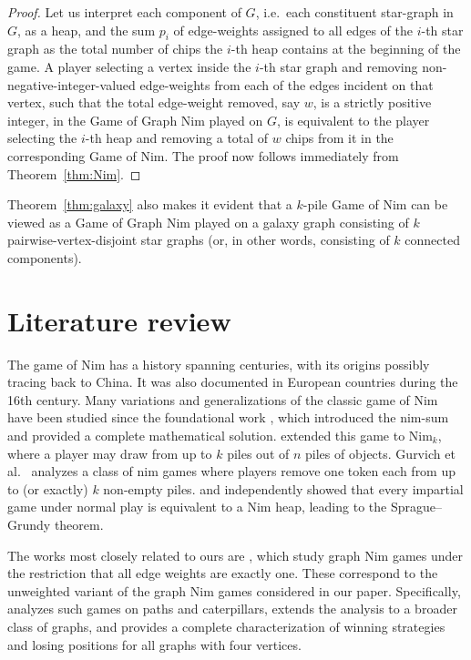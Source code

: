 \documentclass[11pt,reqno]{amsart}
\theoremstyle{definition}
\theoremstyle{definition}
\begin{document}
\begin{proof}
Let us interpret each component of $G$, i.e.\ each constituent star-graph in $G$, as a heap, and the sum $p_{i}$ of edge-weights assigned to all edges of the $i$-th star graph as the total number of chips the $i$-th heap contains at the beginning of the game. A player selecting a vertex inside the $i$-th star graph and removing non-negative-integer-valued edge-weights from each of the edges incident on that vertex, such that the total edge-weight removed, say $w$, is a strictly positive integer, in the Game of Graph Nim played on $G$, is equivalent to the player selecting the $i$-th heap and removing a total of $w$ chips from it in the corresponding Game of Nim. The proof now follows immediately from Theorem~\ref{thm:Nim}.
\end{proof}
Theorem~\ref{thm:galaxy} also makes it evident that a $k$-pile Game of Nim can be viewed as a Game of Graph Nim played on a galaxy graph consisting of $k$ pairwise-vertex-disjoint star graphs (or, in other words, consisting of $k$ connected components).

\section{Literature review}\label{subsec:lit_review}
The game of Nim has a history spanning centuries, with its origins possibly tracing back to China. It was also documented in European countries during the 16th century. 
Many variations and generalizations of the classic game of Nim have been studied since the foundational work \cite{bouton1901nim}, which introduced the nim-sum and provided a complete mathematical solution. \cite{moore1910generalization} extended this game to $\text{Nim}_k$, where a player may draw from up to $k$ piles out of $n$ piles of objects. Gurvich et al.\ \cite{gurvich2015slow} analyzes a class of nim games where players remove one token each from up to (or exactly) $k$ non-empty piles.  \cite{sprague1935mathematische} and \cite{grundy1939mathematics} independently showed that every impartial game under normal play is equivalent to a Nim heap, leading to the Sprague–Grundy theorem. 

The works most closely related to ours are \cite{calkin2010computing,low2016notes,brown2019graphnim}, which study graph Nim games under the restriction that all edge weights are exactly one. These correspond to the unweighted variant of the graph Nim games considered in our paper. Specifically, \cite{calkin2010computing} analyzes such games on paths and caterpillars, \cite{low2016notes} extends the analysis to a broader class of graphs, and \cite{brown2019graphnim} provides a complete characterization of winning strategies and losing positions for all graphs with four vertices.
\end{document}
